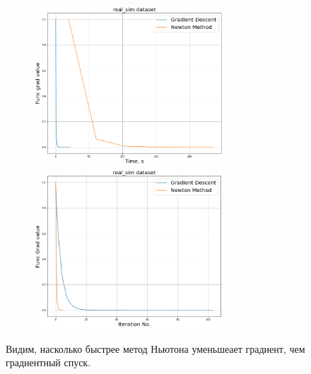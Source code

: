 \documentclass[14pt]{article}
\begin{document}
 \begin{figure}[h]
	\centering
	\includegraphics[height=6cm]{real_grad.png}
	\includegraphics[height=6cm]{real_grad_no.png}
\end{figure}

Видим, насколько быстрее метод Ньютона уменьшеает градиент, чем градиентный спуск.
\end{document}
